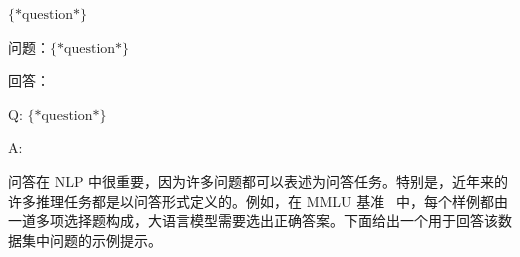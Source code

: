 \vspace{0.5em}
\begin{tcolorbox}

\begingroup
\setlength{\leftskip}{2em}
\setlength{\rightskip}{2em}

$\{*\mathrm{question}*\}$

\vspace{0.3em}

\underline{\hspace{2em}}

\endgroup

\end{tcolorbox}
\vspace{0.5em}

\vspace{0.5em}
\begin{tcolorbox}

\begingroup
\setlength{\leftskip}{2em}
\setlength{\rightskip}{2em}

问题：$\{*\mathrm{question}*\}$

\vspace{0.3em}

回答：\underline{\hspace{2em}}

\endgroup

\end{tcolorbox}
\vspace{0.5em}

\vspace{0.5em}
\begin{tcolorbox}

\begingroup
\setlength{\leftskip}{2em}
\setlength{\rightskip}{2em}

Q: $\{*\mathrm{question}*\}$

\vspace{0.3em}

A: \underline{\hspace{2em}}

\endgroup

\end{tcolorbox}
\vspace{0.5em}

问答在 NLP 中很重要，因为许多问题都可以表述为问答任务。特别是，近年来的许多推理任务都是以问答形式定义的。例如，在 MMLU 基准~\cite{hendrycks-etal:2021measuring} 中，每个样例都由一道多项选择题构成，大语言模型需要选出正确答案。下面给出一个用于回答该数据集中问题的示例提示。

